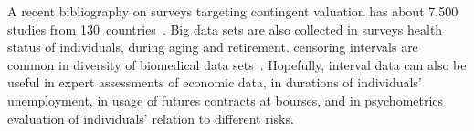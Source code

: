 \begin{multicols}{2}
 A recent bibliography on surveys targeting
contingent valuation has about
7.500 studies from 130~countries~\cite{BK:CA12}. Big data sets are also collected in
surveys health status of individuals, during aging and retirement.
 censoring intervals are common in diversity of biomedical data sets~\cite{BK:KM03}.
 Hopefully, interval data can also be useful in
expert assessments of economic data, in durations of individuals' unemployment, in
usage of futures contracts at bourses, and in psychometrics evaluation of individuals'
relation to different risks.

\renewcommand{\bibname}{\protect\rmfamily References}

\vspace*{-6pt}


{\small\frenchspacing
{%
\begin{thebibliography}{99}


\end{thebibliography}}}
\end{multicols}
